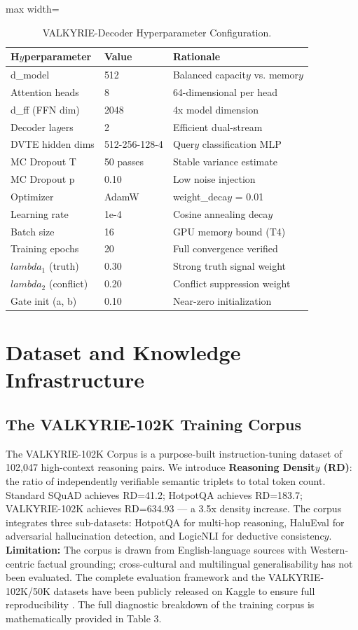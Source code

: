 \documentclass[10pt,journal,compsoc]{IEEEtran}
\begin{document}
\begin{table}[htbp]
\centering
\caption{VALKYRIE-Decoder Hyperparameter Configuration.}
\begin{adjustbox}{max width=\columnwidth}
\begin{tabular}{lll}
\toprule
\textbf{H$y$perparameter} & \textbf{Value} & \textbf{Rationale} \\
\midrule
d\_model & 512 & Balanced capacit$y$ vs. memor$y$ \\
Attention heads & 8 & 64-dimensional per head \\
d\_ff (FFN dim) & 2048 & 4x model dimension \\
Decoder la$y$ers & 2 & Efficient dual-stream \\
DVTE hidden dims & 512-256-128-4 & Quer$y$ classification MLP \\
MC Dropout T & 50 passes & Stable variance estimate \\
MC Dropout p & 0.10 & Low noise injection \\
Optimizer & AdamW & weight\_deca$y$ = 0.01 \\
Learning rate & 1e-4 & Cosine annealing deca$y$ \\
Batch size & 16 & GPU memor$y$ bound (T4) \\
Training epochs & 20 & Full convergence verified \\
$lambda_1$ (truth) & 0.30 & Strong truth signal weight \\
$lambda_2$ (conflict) & 0.20 & Conflict suppression weight \\
Gate init (a, b) & 0.10 & Near-zero initialization \\
\bottomrule
\end{tabular}
\end{adjustbox}
\end{table}

\section{Dataset and Knowledge Infrastructure}
\subsection{The VALKYRIE-102K Training Corpus}
The VALKYRIE-102K Corpus is a purpose-built instruction-tuning dataset of 102,047 high-context reasoning pairs. We introduce \textbf{Reasoning Densit$y$ (RD)}: the ratio of independentl$y$ verifiable semantic triplets to total token count. Standard SQuAD achieves RD=41.2; HotpotQA achieves RD=183.7; VALKYRIE-102K achieves RD=634.93 — a 3.5x densit$y$ increase. The corpus integrates three sub-datasets: HotpotQA for multi-hop reasoning, HaluEval for adversarial hallucination detection, and LogicNLI for deductive consistenc$y$. \textbf{Limitation:} The corpus is drawn from English-language sources with Western-centric factual grounding; cross-cultural and multilingual generalisabilit$y$ has not been evaluated. The complete evaluation framework and the VALKYRIE-102K/50K datasets have been publicly released on Kaggle to ensure full reproducibility \cite{ref26}.
The full diagnostic breakdown of the training corpus is mathematically provided in Table 3.
\end{document}
